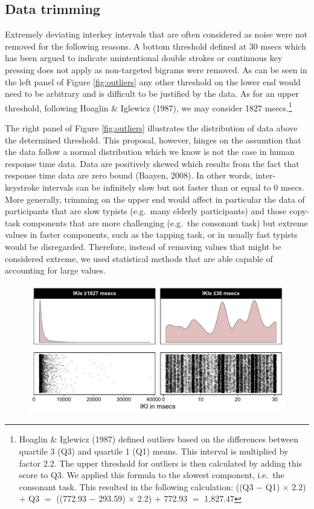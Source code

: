 \begin{appendix}
\hypertarget{data-trimming}{%
\section{Data trimming}\label{data-trimming}}

Extremely deviating interkey intervals that are often considered as
noise were not removed for the following reasons. A bottom threshold
defined at 30 msecs which has been argued to indicate unintentional
double strokes or continuous key pressing does not apply as non-targeted
bigrams were removed. As can be seen in the left panel of Figure
\ref{fig:outliers} any other threshold on the lower end would need to be
arbitrary and is difficult to be justified by the data. As for an upper
threshold, following Hoaglin \& Iglewicz (1987), we may consider 1827
msecs.\footnote{Hoaglin \& Iglewicz (1987) defined outliers based on the
  differences between quartile 3 (Q3) and quartile 1 (Q1) means. This
  interval is multiplied by factor 2.2. The upper threshold for outliers
  is then calculated by adding this score to Q3. We applied this formula
  to the slowest component, i.e.~the consonant task. This resulted in
  the following calculation: ((Q3 \(-\) Q1) \(\times\) 2.2) \(+\) Q3
  \(=\) ((772.93 \(-\) 293.59) \(\times\) 2.2) + 772.93 \(=\) 1,827.47 }

The right panel of Figure \ref{fig:outliers} illustrates the
distribution of data above the determined threshold. This proposal,
however, hinges on the assumtion that the data follow a normal
distribution which we know is not the case in human response time data.
Data are positively skewed which results from the fact that response
time data are zero bound (Baayen, 2008). In other words, inter-keystroke
intervals can be infinitely slow but not faster than or equal to 0
msecs. More generally, trimming on the upper end would affect in
particular the data of participants that are slow typists (e.g.~many
elderly participants) and those copy-task components that are more
challenging (e.g.~the consonant task) but extreme values in faster
components, such as the tapping task, or in usually fast typists would
be disregarded. Therefore, instead of removing values that might be
considered extreme, we used statistical methods that are able capable of
accounting for large values.

\begin{figure}[!h]

{\centering \includegraphics{ct_files/figure-latex/fig0a-1} 

}
\end{figure}
\end{appendix}
